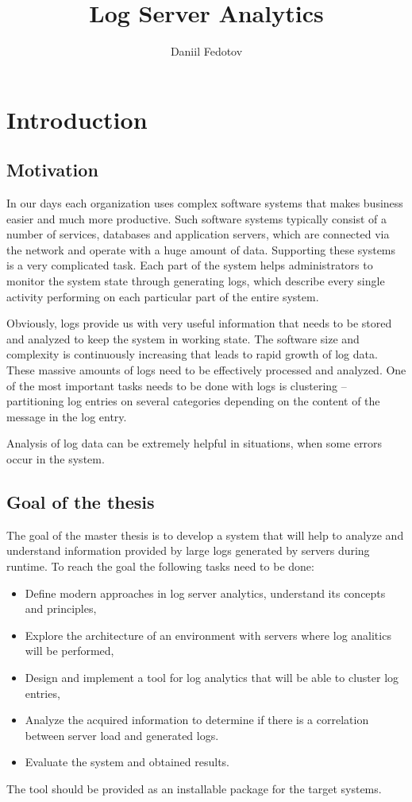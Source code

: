 \documentclass[thesis=M,english]{FITthesis}[2019/12/23]
\title{Log Server Analytics}
\author{Daniil Fedotov} %
\begin{document}


\chapter{Introduction}

\section{Motivation}
In our days each organization uses complex software systems that makes business easier and much more productive. Such software systems typically consist of a number of services, databases and application servers, which are connected via the network and operate with a huge amount of data. Supporting these systems is a very complicated task. Each part of the system helps administrators to monitor the system state through generating logs, which describe every single activity performing on each particular part of the entire system.

Obviously, logs provide us with very useful information that needs to be stored and analyzed to keep the system in working state. The software size and complexity is continuously increasing that leads to rapid growth of log data. These massive amounts of logs need to be effectively processed and analyzed. One of the most important tasks needs to be done with logs is clustering -- partitioning log entries on several categories depending on the content of the message in the log entry.

Analysis of log data can be extremely helpful in situations, when some errors occur in the system. 

\section{Goal of the thesis}
The goal of the master thesis is to develop a system that will help to analyze and understand information provided by large logs generated by servers during runtime. To reach the goal the following tasks need to be done: 
\begin{itemize}
	\item Define modern approaches in log server analytics, understand its concepts and principles,
	\item Explore the architecture of an environment with servers where log analitics will be performed,
	\item Design and implement a tool for log analytics that will be able to cluster log entries, 
	\item Analyze the acquired information to determine if there is a correlation between server load and generated logs.
	\item Evaluate the system and obtained results.
\end{itemize}
The tool should be provided as an installable package for the target systems.
\end{document}
